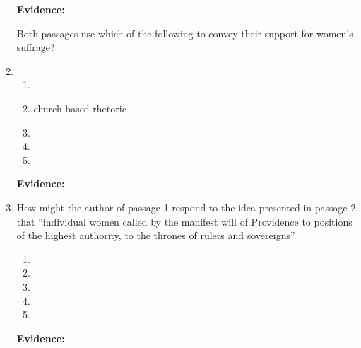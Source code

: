 \begin{enumerate}
\bigskip
\textbf{Evidence:} \hrulefill

\bigskip Both passages use which of the following to convey their support for women's suffrage?
\item 

\bigskip
\begin{enumerate}[label=(\Alph*)]
\item 
\item church-based rhetoric
\item 
\item 
\item 
\end{enumerate}

\bigskip
\textbf{Evidence:} \hrulefill

\bigskip
\item How might the author of passage 1 respond to the idea presented in passage 2 that ``individual women called by the manifest will of Providence to positions of the highest authority, to the thrones of rulers and sovereigns''

\bigskip
\begin{enumerate}[label=(\Alph*)]
\item 
\item
\item 
\item 
\item 
\end{enumerate}

\bigskip
\textbf{Evidence:} \hrulefill

\end{enumerate}

